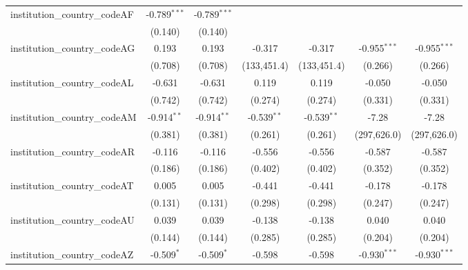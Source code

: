 \begin{tabular}{lcccccc}
   institution\_country\_codeAF          & -0.789$^{***}$ & -0.789$^{***}$ &                &                &                &   \\   
                                         & (0.140)        & (0.140)        &                &                &                &   \\   
   institution\_country\_codeAG          & 0.193          & 0.193          & -0.317         & -0.317         & -0.955$^{***}$ & -0.955$^{***}$\\   
                                         & (0.708)        & (0.708)        & (133,451.4)    & (133,451.4)    & (0.266)        & (0.266)\\   
   institution\_country\_codeAL          & -0.631         & -0.631         & 0.119          & 0.119          & -0.050         & -0.050\\   
                                         & (0.742)        & (0.742)        & (0.274)        & (0.274)        & (0.331)        & (0.331)\\   
   institution\_country\_codeAM          & -0.914$^{**}$  & -0.914$^{**}$  & -0.539$^{**}$  & -0.539$^{**}$  & -7.28          & -7.28\\   
                                         & (0.381)        & (0.381)        & (0.261)        & (0.261)        & (297,626.0)    & (297,626.0)\\   
   institution\_country\_codeAR          & -0.116         & -0.116         & -0.556         & -0.556         & -0.587         & -0.587\\   
                                         & (0.186)        & (0.186)        & (0.402)        & (0.402)        & (0.352)        & (0.352)\\   
   institution\_country\_codeAT          & 0.005          & 0.005          & -0.441         & -0.441         & -0.178         & -0.178\\   
                                         & (0.131)        & (0.131)        & (0.298)        & (0.298)        & (0.247)        & (0.247)\\   
   institution\_country\_codeAU          & 0.039          & 0.039          & -0.138         & -0.138         & 0.040          & 0.040\\   
                                         & (0.144)        & (0.144)        & (0.285)        & (0.285)        & (0.204)        & (0.204)\\   
   institution\_country\_codeAZ          & -0.509$^{*}$   & -0.509$^{*}$   & -0.598         & -0.598         & -0.930$^{***}$ & -0.930$^{***}$\\   

\end{tabular}
